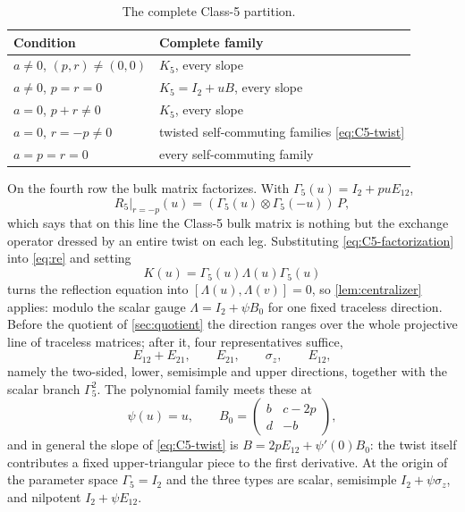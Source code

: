 \documentclass[11pt,reqno]{amsart}
\theoremstyle{plain}
\theoremstyle{definition}
\theoremstyle{remark}
\numberwithin{equation}{section}
\newcommand{\Id}{I_2}
\begin{document}
\begin{table}[t]
\centering\small
\caption{The complete Class-5 partition.}
\label{tab:C5-cells}
\begin{tabularx}{\textwidth}{>{\RaggedRight\arraybackslash}X >{\RaggedRight\arraybackslash}X}
\toprule
Condition & Complete family \\
\midrule
$a\ne0$, $(p,r)\ne(0,0)$ & $K_5$, every slope \\
$a\ne0$, $p=r=0$ & $K_5=\Id+uB$, every slope \\
$a=0$, $p+r\ne0$ & $K_5$, every slope \\
$a=0$, $r=-p\ne0$ & twisted self-commuting families \cref{eq:C5-twist} \\
$a=p=r=0$ & every self-commuting family \\
\bottomrule
\end{tabularx}
\end{table}

On the fourth row the bulk matrix factorizes. With $\Gamma_5(u)=\Id+puE_{12}$,
\begin{equation}
R_5\big|_{r=-p}(u)=(\Gamma_5(u)\otimes\Gamma_5(-u))\,P,
\label{eq:C5-factorization}
\end{equation}
which says that on this line the Class-5 bulk matrix is nothing but the exchange
operator dressed by an entire twist on each leg. Substituting
\cref{eq:C5-factorization} into \cref{eq:re} and setting
\begin{equation}
K(u)=\Gamma_5(u)\Lambda(u)\Gamma_5(u)                    \label{eq:C5-twist}
\end{equation}
turns the reflection equation into $[\Lambda(u),\Lambda(v)]=0$, so
\cref{lem:centralizer} applies: modulo the scalar gauge $\Lambda=\Id+\psi B_0$
for one fixed traceless direction. Before the quotient of \cref{sec:quotient} the
direction ranges over the whole projective line of traceless matrices; after it,
four representatives suffice,
\begin{equation}
E_{12}+E_{21},\qquad E_{21},\qquad \sigma_z,\qquad E_{12},
\label{eq:C5-shapes}
\end{equation}
namely the two-sided, lower, semisimple and upper directions, together with the
scalar branch $\Gamma_5^2$. The polynomial family meets these at
\begin{equation}
\psi(u)=u,\qquad
B_0=\begin{pmatrix}b&c-2p\\d&-b\end{pmatrix},       \label{eq:C5-overlap}
\end{equation}
and in general the slope of \cref{eq:C5-twist} is $B=2pE_{12}+\psi'(0)B_0$: the
twist itself contributes a fixed upper-triangular piece to the first derivative.
At the origin of the parameter space $\Gamma_5=\Id$ and the three types are
scalar, semisimple $\Id+\psi\sigma_z$, and nilpotent $\Id+\psi E_{12}$.
\end{document}
